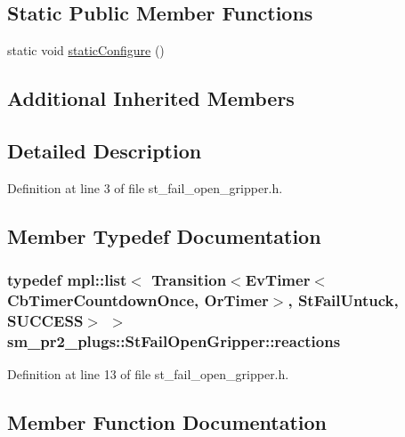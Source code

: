 \subsection*{Static Public Member Functions}
\begin{DoxyCompactItemize}
\item 
static void \hyperlink{structsm__pr2__plugs_1_1StFailOpenGripper_aec94e3e8bea31f8eb3f37c11e57fd5d1}{static\+Configure} ()
\end{DoxyCompactItemize}
\subsection*{Additional Inherited Members}


\subsection{Detailed Description}


Definition at line 3 of file st\+\_\+fail\+\_\+open\+\_\+gripper.\+h.



\subsection{Member Typedef Documentation}
\subsubsection[{\texorpdfstring{reactions}{reactions}}]{\setlength{\rightskip}{0pt plus 5cm}typedef mpl\+::list$<$ Transition$<$Ev\+Timer$<$Cb\+Timer\+Countdown\+Once, {\bf Or\+Timer}$>$, {\bf St\+Fail\+Untuck}, {\bf S\+U\+C\+C\+E\+SS}$>$ $>$ {\bf sm\+\_\+pr2\+\_\+plugs\+::\+St\+Fail\+Open\+Gripper\+::reactions}}\hypertarget{structsm__pr2__plugs_1_1StFailOpenGripper_a64622a0c63bb5c86b60552ba92437e91}{}\label{structsm__pr2__plugs_1_1StFailOpenGripper_a64622a0c63bb5c86b60552ba92437e91}


Definition at line 13 of file st\+\_\+fail\+\_\+open\+\_\+gripper.\+h.



\subsection{Member Function Documentation}
